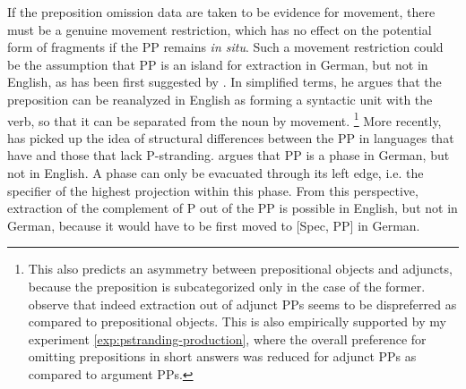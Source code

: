If the preposition omission data are taken to be evidence for movement, there must be a genuine movement restriction, which has no effect on the potential form of fragments if the PP remains \textit{in situ}. Such a movement restriction could be the assumption that PP is an island for extraction in German, but not in English, as has been first suggested by \citet{vanriemsdijk1978}. In simplified terms, he argues that the preposition can be reanalyzed in English as forming a syntactic unit with the verb, so that it can be separated from the noun by movement.%
%
\footnote{This also predicts an asymmetry between prepositional objects and adjuncts, because the preposition is subcategorized only in the case of the former. \citet{pullum.huddleston2002} observe that indeed extraction out of adjunct PPs seems to be dispreferred as compared to prepositional objects. This is also empirically supported by my experiment \ref{exp:pstranding-production}, where the overall preference for omitting prepositions in short answers was reduced for adjunct PPs as compared to argument PPs.}\afterfn%
%
More recently, \citet{abels2003} has picked up the idea of structural differences between the PP in languages that have and those that lack P-stranding. \citeauthor{abels2003} argues that PP is a phase in German, but not in English. A phase can only be evacuated through its left edge, i.e. the specifier of the highest projection within this phase. From this perspective, extraction of the complement of P out of the PP is possible in English, but not in German, because it would have to be first moved to [Spec, PP] in German. 

